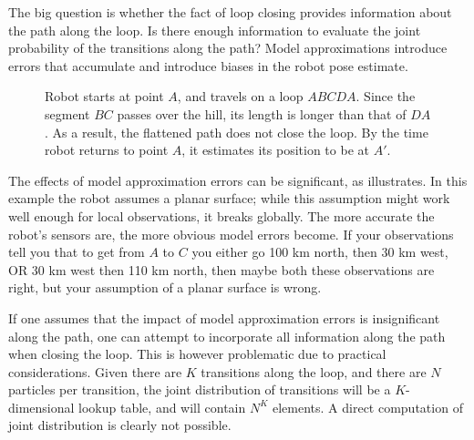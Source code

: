 The big question is whether the fact of loop closing provides
information about the path along the loop. Is there enough information
to evaluate the joint probability of the transitions along the
path? Model approximations introduce errors that accumulate and
introduce biases in the robot pose estimate.

\begin{figure}[htbp]
  \centering

\caption[Effect of unmodelled environment features on localisation]
{Robot starts at point $A$, and travels on a loop
$ABCDA$. Since the segment $BC$ passes over the hill, its length
is longer than that of $DA$. As a result, the flattened path does not
close the loop. By the time robot returns to point $A$, it
estimates its position to be at $A'$.}
  \label{fig:hump}
\end{figure}


The effects of model approximation errors can be significant, as
 illustrates. In this example the robot assumes a
planar surface; while this assumption might work well enough for local
observations, it breaks globally. The more accurate the robot's
sensors are, the more obvious model errors become. If your
observations tell you that to get from $A$ to $C$ you either go 100 km
north, then 30 km west, OR 30 km west then 110 km north, then maybe
both these observations are right, but your assumption of a planar
surface is wrong.

If one assumes that the impact of model approximation errors is
insignificant along the path, one can attempt to incorporate all
information along the path when closing the loop. This is however
problematic due to practical considerations. Given there are $K$
transitions along the loop, and there are $N$ particles per
transition, the joint distribution of transitions will be a
$K$-dimensional lookup table, and will contain $N^K$ elements. A
direct computation of joint distribution is clearly not possible.

